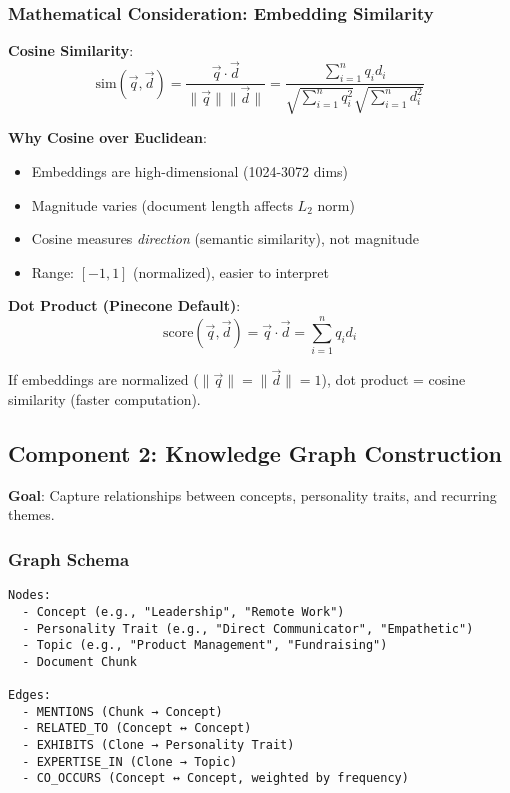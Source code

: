 \documentclass[10pt]{article}
\begin{document}
\subsubsection{Mathematical Consideration: Embedding Similarity}

\textbf{Cosine Similarity}:
\[
\text{sim}(\vec{q}, \vec{d}) = \frac{\vec{q} \cdot \vec{d}}{\|\vec{q}\| \|\vec{d}\|} = \frac{\sum_{i=1}^{n} q_i d_i}{\sqrt{\sum_{i=1}^{n} q_i^2} \sqrt{\sum_{i=1}^{n} d_i^2}}
\]

\textbf{Why Cosine over Euclidean}:
\begin{itemize}[leftmargin=*]
    \item Embeddings are high-dimensional (1024-3072 dims)
    \item Magnitude varies (document length affects $L_2$ norm)
    \item Cosine measures \textit{direction} (semantic similarity), not magnitude
    \item Range: $[-1, 1]$ (normalized), easier to interpret
\end{itemize}

\textbf{Dot Product (Pinecone Default)}:
\[
\text{score}(\vec{q}, \vec{d}) = \vec{q} \cdot \vec{d} = \sum_{i=1}^{n} q_i d_i
\]

If embeddings are normalized ($\|\vec{q}\| = \|\vec{d}\| = 1$), dot product = cosine similarity (faster computation).

\subsection{Component 2: Knowledge Graph Construction}

\textbf{Goal}: Capture relationships between concepts, personality traits, and recurring themes.

\subsubsection{Graph Schema}

\begin{verbatim}
Nodes:
  - Concept (e.g., "Leadership", "Remote Work")
  - Personality Trait (e.g., "Direct Communicator", "Empathetic")
  - Topic (e.g., "Product Management", "Fundraising")
  - Document Chunk

Edges:
  - MENTIONS (Chunk → Concept)
  - RELATED_TO (Concept ↔ Concept)
  - EXHIBITS (Clone → Personality Trait)
  - EXPERTISE_IN (Clone → Topic)
  - CO_OCCURS (Concept ↔ Concept, weighted by frequency)
\end{verbatim}
\end{document}

